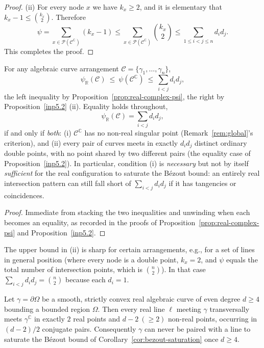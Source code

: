 \documentclass[article,11pt]{amsart} \numberwithin{equation}{section}
\numberwithin{equation}{section}
\begin{document}
{\begin{proof}
	(ii) For every node $x$ we have $k_x \ge 2$, and it is elementary that $k_x-1 \le \binom{k_x}{2}$. Therefore
	\[
	\psi = \sum_{x\in\mathcal{P}(\mathcal{C}^\mathbb{C})} (k_x-1) \le \sum_{x\in\mathcal{P}(\mathcal{C}^\mathbb{C})} \binom{k_x}{2} \le \sum_{1\le i<j\le n} d_i d_j.
	\]
	This completes the proof.
\end{proof}

\begin{cor}
	\label{cor:bezout-saturation}
	For any algebraic curve arrangement $\mathcal C=\{\gamma_1,\dots,\gamma_n\}$,
	\[
	\psi_\mathbb R(\mathcal C)\ \le\ \psi(\mathcal C^\mathbb C)\ \le\ \sum_{i<j}d_id_j,
	\]
	the left inequality by Proposition~\ref{prop:real-complex-psi}, the right
	by Proposition~\ref{inp5.2} (ii). Equality holds throughout,
	\[
	\psi_\mathbb R(\mathcal C)=\sum_{i<j}d_id_j,
	\]
	if and only if \emph{both}: (i) $\mathcal C^\mathbb C$ has no non-real singular
	point (Remark~\ref{rem:global}'s criterion), and (ii) every pair of curves
	meets in exactly $d_id_j$ distinct ordinary double points, with no point
	shared by two different pairs (the equality case of Proposition~\ref{inp5.2}). In
	particular, condition (i) is \emph{necessary} but not by itself
	\emph{sufficient} for the real configuration to saturate the Bézout bound:
	an entirely real intersection pattern can still fall short of
	$\sum_{i<j}d_id_j$ if it has tangencies or coincidences.
\end{cor}

\begin{proof}
	Immediate from stacking the two inequalities and unwinding when each
	becomes an equality, as recorded in the proofs of
	Proposition~\ref{prop:real-complex-psi} and Proposition~\ref{inp5.2}.
\end{proof}

\begin{rk}
	The upper bound in (ii) is sharp for certain arrangements, e.g., for a set of lines in general position (where every node is a double point, $k_x=2$, and $\psi$ equals the total number of intersection points, which is $\binom{n}{2}$). In that case $\sum_{i<j} d_i d_j = \binom{n}{2}$ because each $d_i=1$.
\end{rk}

\begin{inp}
	\label{prop:convex-obstruction}
	Let $\gamma=\partial\Omega$ be a smooth, strictly convex real algebraic curve of
	even degree $d\ge4$ bounding a bounded region $\Omega$. Then every real
	line $\ell$ meeting $\gamma$ transversally meets $\gamma^\mathbb C$ in exactly $2$ real
	points and $d-2\ (\ge2)$ non-real points, occurring in $(d-2)/2$ conjugate
	pairs. Consequently $\gamma$ can never be paired with a line to saturate the
	Bézout bound of Corollary~\ref{cor:bezout-saturation} once $d\ge4$.
\end{inp}

}
\end{document}
